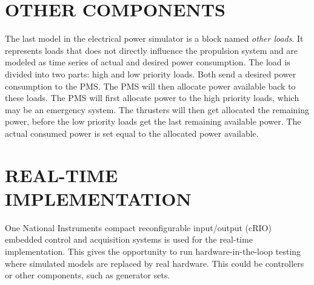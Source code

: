 \documentclass[twocolumn,10pt]{asme2e}
\begin{document}
%


\section*{\uppercase{Other Components}}
The last model in the electrical power simulator is a block named \textit{other loads}.
It represents loads that does not directly influence the propulsion system and are modeled as time series of actual and desired power consumption.
The load is divided into two parts: high and low priority loads.
Both send a desired power consumption to the PMS.
The PMS will then allocate power available back to these loads.
The PMS will first allocate power to the high priority loads, which may be an emergency system.
The thrusters will then get allocated the remaining power, before the low priority loads get the last remaining available power.
The actual consumed power is set equal to the allocated power available.



\section*{\uppercase{Real-time Implementation}}
One National Instruments compact reconfigurable input/output (cRIO) embedded control and acquisition systems is used for the real-time implementation.
This gives the opportunity to run hardware-in-the-loop testing where simulated models are replaced by real hardware.
This could be controllers or other components, such as generator sets.
\end{document}
